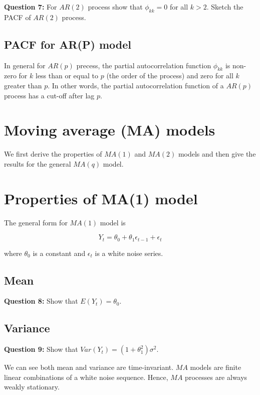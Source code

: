 \documentclass[
  11pt,
  a4paper,
]{report}
\begin{document}
\textbf{Question 7:} For \(AR(2)\) process show that \(\phi_{kk}=0\) for
all \(k>2\). Sketch the PACF of \(AR(2)\) process.

\subsection{PACF for AR(P) model}\label{pacf-for-arp-model}

In general for \(AR(p)\) precess, the partial autocorrelation function
\(\phi_{kk}\) is non-zero for \(k\) less than or equal to \(p\) (the
order of the process) and zero for all \(k\) greater than \(p\). In
other words, the partial autocorrelation function of a \(AR(p)\) process
has a cut-off after lag \(p\).

\section{Moving average (MA) models}\label{moving-average-ma-models}

We first derive the properties of \(MA(1)\) and \(MA(2)\) models and
then give the results for the general \(MA(q)\) model.

\section{Properties of MA(1) model}\label{properties-of-ma1-model}

The general form for \(MA(1)\) model is

\begin{equation}
Y_t = \theta_0 + \theta_1 \epsilon_{t-1} + \epsilon_t
\end{equation}

where \(\theta_0\) is a constant and \({\epsilon_t}\) is a white noise
series.

\subsection{Mean}\label{mean-3}

\textbf{Question 8:} Show that \(E(Y_t) = \theta_0\).

\subsection{Variance}\label{variance-2}

\textbf{Question 9:} Show that \(Var(Y_t) = (1+\theta_1^2)\sigma^2\).

We can see both mean and variance are time-invariant. \(MA\) models are
finite linear combinations of a white noise sequence. Hence, \(MA\)
processes are always weakly stationary.
\end{document}
